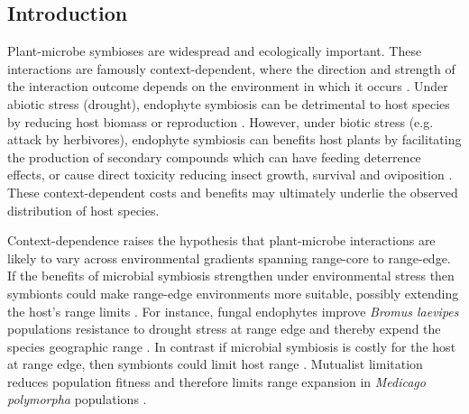 \documentclass[12pt,english]{article}
\begin{document}
\newpage
\begin{spacing}{1.9}
\section*{Introduction}
Plant-microbe symbioses are widespread and ecologically important. 
These interactions are famously context-dependent, where the direction and strength of the interaction outcome depends on the environment in which it occurs \citep{fowler2023geographic,davitt2011understanding}.
Under abiotic stress (drought), endophyte symbiosis can be detrimental to host species by reducing host biomass or reproduction \citep{cui2024review}. 
However, under biotic stress (e.g. attack by herbivores), endophyte symbiosis can benefits host plants by 
facilitating the production of secondary compounds which can have feeding deterrence effects, or cause direct toxicity reducing insect growth, survival and oviposition \citep{atala2022fungal,bastias2017epichloe,vega2008insect}.
These context-dependent costs and benefits may ultimately underlie the observed distribution of host species. 

Context-dependence raises the hypothesis that plant-microbe interactions are likely to vary across environmental gradients spanning range-core to range-edge. 
If the benefits of microbial symbiosis strengthen under environmental stress then symbionts could make range-edge environments more suitable, possibly extending the host’s range limits \citep{allsup2023shifting,rudgers2020climate}.
For instance, fungal endophytes improve \emph{Bromus laevipes} populations resistance to drought stress at range edge and thereby expend the species geographic range \citep{david2019soil,afkhami2014mutualist}.
In contrast if microbial symbiosis is costly for the host at range edge, then symbionts could limit host range \citep{benning2021microbes,benning2021plant,bennett2022costs}.
Mutualist limitation reduces population fitness and therefore limits range expansion in \emph{Medicago polymorpha} populations \citep{lopez2021microbial}. 


\end{spacing}
\end{document}
